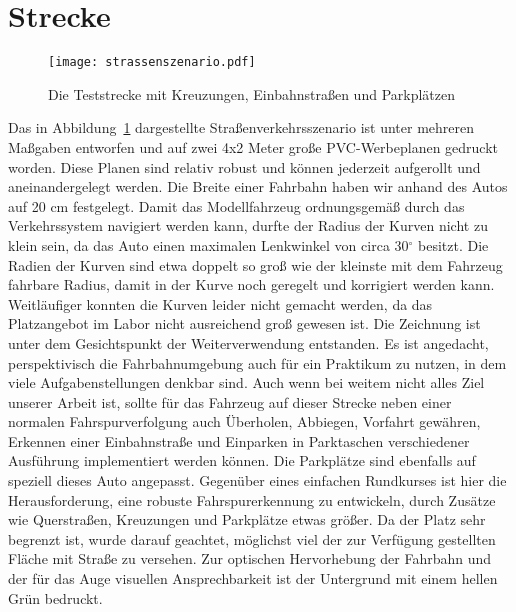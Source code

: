 \section{Strecke}

\begin{figure}[H] %
  \centering
  \texttt{[image: strassenszenario.pdf]}
  \caption{Die Teststrecke mit Kreuzungen, Einbahnstraßen und Parkplätzen}
  \label{fig:strassenszenario}
\end{figure}

Das in Abbildung~\ref{fig:strassenszenario} dargestellte Straßenverkehrsszenario ist unter mehreren Maßgaben entworfen und auf zwei 4x2 Meter große PVC-Werbeplanen gedruckt worden. Diese Planen sind relativ robust und können jederzeit aufgerollt und aneinandergelegt werden. Die Breite einer Fahrbahn haben wir anhand des Autos auf 20 cm festgelegt. Damit das Modellfahrzeug ordnungsgemäß durch das Verkehrssystem navigiert werden kann, durfte der Radius der Kurven nicht zu klein sein, da das Auto einen maximalen Lenkwinkel von circa 30\(^\circ\) besitzt. Die Radien der Kurven sind etwa doppelt so groß wie der kleinste mit dem Fahrzeug fahrbare Radius, damit in der Kurve noch geregelt und korrigiert werden kann. Weitläufiger konnten die Kurven leider nicht gemacht werden, da das Platzangebot im Labor nicht ausreichend groß gewesen ist.
Die Zeichnung ist unter dem Gesichtspunkt der Weiterverwendung entstanden. Es ist angedacht, perspektivisch die Fahrbahnumgebung auch für ein Praktikum zu nutzen, in dem viele Aufgabenstellungen denkbar sind. Auch wenn bei weitem nicht alles Ziel unserer Arbeit ist, sollte für das Fahrzeug auf dieser Strecke neben einer normalen Fahrspurverfolgung auch Überholen, Abbiegen, Vorfahrt gewähren, Erkennen einer Einbahnstraße und Einparken in Parktaschen verschiedener Ausführung implementiert werden können. Die Parkplätze sind ebenfalls auf speziell dieses Auto angepasst. Gegenüber eines einfachen Rundkurses ist hier die Herausforderung, eine robuste Fahrspurerkennung zu entwickeln, durch Zusätze wie Querstraßen, Kreuzungen und Parkplätze etwas größer. Da der Platz sehr begrenzt ist, wurde darauf geachtet, möglichst viel der zur Verfügung gestellten Fläche mit Straße zu versehen. Zur optischen Hervorhebung der Fahrbahn und der für das Auge visuellen Ansprechbarkeit ist der Untergrund mit einem hellen Grün bedruckt.
